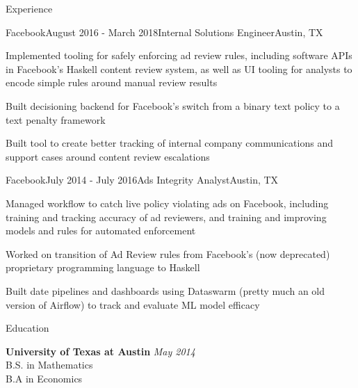 \documentclass{resume} %
\begin{document}
\begin{rSection}{Experience}
\begin{rSubsection}{Facebook}{August 2016 - March 2018}{Internal Solutions Engineer}{Austin, TX}
\item Implemented tooling for safely enforcing ad review rules, including software APIs in Facebook's Haskell content review system, as well as UI tooling for analysts to encode simple rules around manual review results
\item Built decisioning backend for Facebook's switch from a binary text policy to a text penalty framework
\item Built tool to create better tracking of internal company communications and support cases around content review escalations
\end{rSubsection}


\begin{rSubsection}{Facebook}{July 2014 - July 2016}{Ads Integrity Analyst}{Austin, TX}
\item Managed workflow to catch live policy violating ads on Facebook, including training and tracking accuracy of ad reviewers, and training and improving models and rules for automated enforcement
\item Worked on transition of Ad Review rules from Facebook's (now deprecated) proprietary programming language to Haskell
\item Built date pipelines and dashboards using Dataswarm (pretty much an old version of Airflow) to track and evaluate ML model efficacy
\end{rSubsection}

\end{rSection}


\begin{rSection}{Education}

{\bf University of Texas at Austin} \hfill {\em May 2014} \\
B.S. in Mathematics \\
B.A in Economics

\end{rSection}


\end{document}
